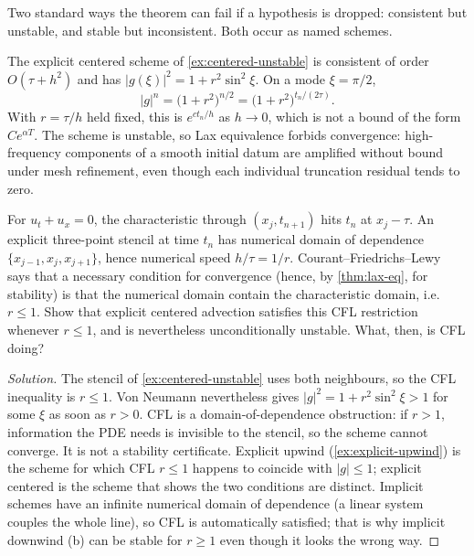 \documentclass[11pt,a4paper]{article}
\begin{document}
Two standard ways the theorem can fail if a hypothesis is dropped: consistent but unstable, and stable but inconsistent. Both occur as named schemes.

\begin{example}
\label{ex:lax-centered}
The explicit centered scheme of \cref{ex:centered-unstable} is consistent of order \(O(\tau+h^2)\) and has \(|g(\xi)|^2=1+r^2\sin^2\xi\). On a mode \(\xi=\pi/2\),
\[
\bigl|g\bigr|^n
=
\bigl(1+r^2\bigr)^{n/2}
=
\bigl(1+r^2\bigr)^{t_n/(2\tau)}.
\]
With \(r=\tau/h\) held fixed, this is \(e^{c t_n/h}\) as \(h\to 0\), which is not a bound of the form \(C e^{\alpha T}\). The scheme is unstable, so Lax equivalence forbids convergence: high-frequency components of a smooth initial datum are amplified without bound under mesh refinement, even though each individual truncation residual tends to zero.
\end{example}

\begin{exercise}
\label{exer:cfl}
For \(u_t+u_x=0\), the characteristic through \((x_j,t_{n+1})\) hits \(t_n\) at \(x_j-\tau\). An explicit three-point stencil at time \(t_n\) has numerical domain of dependence \(\{x_{j-1},x_j,x_{j+1}\}\), hence numerical speed \(h/\tau=1/r\). Courant--Friedrichs--Lewy says that a necessary condition for convergence (hence, by \cref{thm:lax-eq}, for stability) is that the numerical domain contain the characteristic domain, i.e. \(r\le 1\). Show that explicit centered advection satisfies this CFL restriction whenever \(r\le 1\), and is nevertheless unconditionally unstable. What, then, is CFL doing?
\end{exercise}

\begin{proof}[Solution]
The stencil of \cref{ex:centered-unstable} uses both neighbours, so the CFL inequality is \(r\le 1\). Von Neumann nevertheless gives \(|g|^2=1+r^2\sin^2\xi>1\) for some \(\xi\) as soon as \(r>0\). CFL is a domain-of-dependence obstruction: if \(r>1\), information the PDE needs is invisible to the stencil, so the scheme cannot converge. It is not a stability certificate. Explicit upwind (\cref{ex:explicit-upwind}) is the scheme for which CFL \(r\le 1\) happens to coincide with \(|g|\le 1\); explicit centered is the scheme that shows the two conditions are distinct. Implicit schemes have an infinite numerical domain of dependence (a linear system couples the whole line), so CFL is automatically satisfied; that is why implicit downwind (b) can be stable for \(r\ge 1\) even though it looks the wrong way.
\end{proof}
\end{document}
